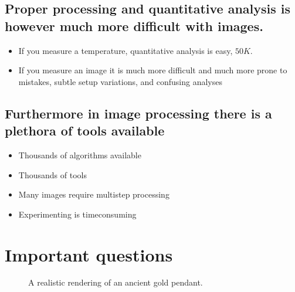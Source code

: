 \documentclass[letterpaper,10pt,english]{sphinxmanual}
\begin{document}
\subsection{Proper processing and quantitative analysis is however much more difficult with images.}
\label{\detokenize{01-Introduction:proper-processing-and-quantitative-analysis-is-however-much-more-difficult-with-images}}\begin{itemize}
\item {} 
\sphinxAtStartPar
If you measure a temperature, quantitative analysis is easy, \(50K\).

\item {} 
\sphinxAtStartPar
If you measure an image it is much more difficult and much more prone to mistakes, subtle setup variations, and confusing analyses

\end{itemize}


\subsection{Furthermore in image processing there is a plethora of tools available}
\label{\detokenize{01-Introduction:furthermore-in-image-processing-there-is-a-plethora-of-tools-available}}\begin{itemize}
\item {} 
\sphinxAtStartPar
Thousands of algorithms available

\item {} 
\sphinxAtStartPar
Thousands of tools

\item {} 
\sphinxAtStartPar
Many images require multi\sphinxhyphen{}step processing

\item {} 
\sphinxAtStartPar
Experimenting is time\sphinxhyphen{}consuming

\end{itemize}


\section{Important questions}
\label{\detokenize{01-Introduction:important-questions}}
\begin{figure}[htbp]
\centering
\capstart

\noindent{}
\caption{A realistic rendering of an ancient gold pendant.}\label{\detokenize{01-Introduction:id19}}\end{figure}
\end{document}
